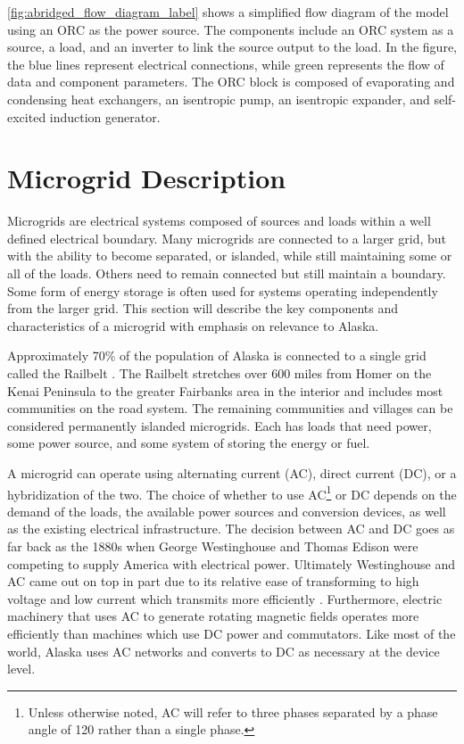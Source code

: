 \autoref{fig:abridged_flow_diagram_label} shows a simplified flow diagram of the model using an ORC as the power source. The components include an ORC system as a source, a load, and an inverter to link the source output to the load. In the figure, the blue lines represent electrical connections, while green represents the flow of data and component parameters. The ORC block is composed of evaporating and condensing heat exchangers, an isentropic pump, an isentropic expander, and self-excited induction generator. 


\section{Microgrid Description}
Microgrids are electrical systems composed of sources and loads within a well defined electrical boundary. Many microgrids are connected to a larger grid, but with the ability to become separated, or islanded, while still maintaining some or all of the loads. Others need to remain connected but still maintain a boundary. Some form of energy storage is often used for systems operating independently from the larger grid. This section will describe the key components and characteristics of a microgrid with emphasis on relevance to Alaska.

Approximately 70\% of the population of Alaska is connected to a single grid called the Railbelt \cite{railbelt}. The Railbelt stretches over 600 miles from Homer on the Kenai Peninsula to the greater Fairbanks area in the interior and includes most communities on the road system. The remaining communities and villages can be considered permanently islanded microgrids. Each has loads that need power, some power source, and some system of storing the energy or fuel.

A microgrid can operate using alternating current (AC), direct current (DC), or a hybridization of the two. The choice of whether to use AC\footnote{Unless otherwise noted, AC will refer to three phases separated by a phase angle of 120\textdegree{} rather than a single phase.} or DC depends on the demand of the loads, the available power sources and conversion devices, as well as the existing electrical infrastructure. The decision between AC and DC goes as far back as the 1880s when George Westinghouse and Thomas Edison were competing to supply America with electrical power. Ultimately Westinghouse and AC came out on top in part due to its relative ease of transforming to high voltage and low current which transmits more efficiently \cite{Hughes1983}. Furthermore, electric machinery that uses AC to generate rotating magnetic fields operates more efficiently than machines which use DC power and commutators. Like most of the world, Alaska uses AC networks and converts to DC as necessary at the device level.

